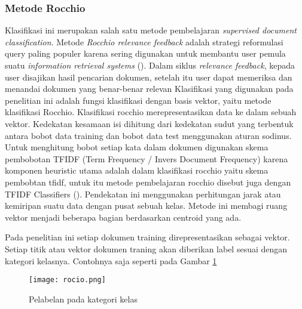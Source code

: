 \subsubsection*{Metode Rocchio}
Klasifikasi ini merupakan salah satu metode pembelajaran \textit{supervised document classification}. Metode \textit{Rocchio relevance feedback} adalah strategi reformulasi query paling populer karena sering digunakan untuk membantu user pemula suatu \textit{information retrieval systems} (\cite{Joachims:1997:PAR:645526.657278}). Dalam siklus \textit{relevance feedback}, kepada user disajikan hasil pencarian dokumen, setelah itu user dapat memeriksa dan menandai dokumen yang benar-benar relevan Klasifikasi yang digunakan pada penelitian ini adalah fungsi klasifikasi dengan basis vektor, yaitu metode klasifikasi Rocchio. Klasifikasi rocchio merepresentasikan data ke dalam sebuah vektor. Kedekatan kesamaan isi dihitung dari kedekatan sudut yang terbentuk antara bobot data training dan bobot data test menggunakan aturan sodinus. Untuk menghitung bobot setiap kata dalam dokumen digunakan skema pembobotan TFIDF (Term Frequency / Invers Document Frequency) karena komponen heuristic utama adalah dalam klasifikasi rocchio yaitu skema pembobtan tfidf, untuk itu metode pembelajaran rocchio disebut juga dengan TFIDF Classifiers (\cite{Joachims:1997:PAR:645526.657278}). Pendekatan ini menggunakan perhitungan jarak atau kemiripan suatu data dengan pusat sebuah kelas. Metode ini membagi ruang vektor menjadi beberapa bagian berdasarkan centroid yang ada. 

Pada penelitian ini setiap dokumen training direpresentasikan sebagai vektor. Setiap titik atau vektor dokumen traning akan diberikan label sesuai dengan kategori kelasnya. Contohnya saja seperti pada Gambar \ref{fig:rocio} 

\begin{figure}[h!] %
	\centering
	\texttt{[image: rocio.png]}
	\caption{Pelabelan pada kategori kelas}
	\label{fig:rocio}
\end{figure}

